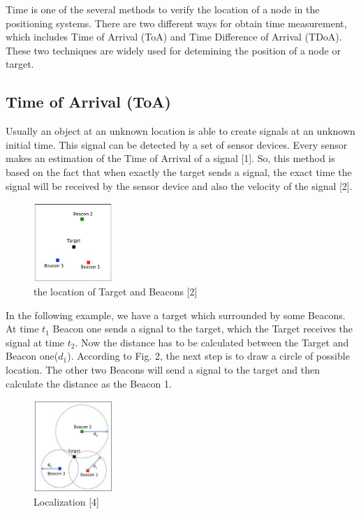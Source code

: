 Time is one of the several methods to verify the location of a node in the positioning systems. There are two different ways for obtain time measurement, which includes Time of Arrival (ToA) and Time Difference of Arrival (TDoA). These two techniques are widely used for detemining the position of a node or target.

\subsection{Time of Arrival (ToA)}

Usually an object at an unknown location is able to create signals at an unknown initial time. This signal can be detected by a set of sensor devices. Every sensor makes an estimation of the Time of Arrival of a signal [1]. So, this method is based on the fact that when exactly the target sends a signal, the exact time the signal will be received by the sensor device and also the velocity of the signal [2].

\begin{figure}[htp]
    \centering
    \includegraphics[width=3cm]{1.jpg}
    \caption{the location of Target and Beacons [2]}
    \label{fig:Target location}
\end{figure}

In the following example, we have a target which surrounded by some Beacons. At time $t_1$ Beacon one sends a signal to the target, which the Target receives the signal at time $t_2$. Now the distance has to be calculated between the Target and Beacon one($d_1$). According to Fig. 2, the next step is to draw a circle of possible location. The other two Beacons will send a signal to the target and then calculate the distance as the Beacon 1.

\begin{figure}[htp]
    \centering
    \includegraphics[width=3cm]{2.jpg}
    \caption{Localization [4]}
    \label{fig:Localization}
\end{figure}


